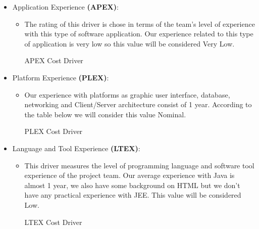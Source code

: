 \begin{itemize}
	\item Application Experience \textbf{(APEX)}: 
	\begin{itemize}
	\item[] The rating of this driver is chose in terms of the team's level of experience with this type of software application. Our experience related to this type of application is very low so this value will be considered \textsf{Very Low}.
	\begin{costdriverstable}{APEX Cost Driver}
		\hline
	\end{costdriverstable}
	\end{itemize}
\end{itemize}

\begin{itemize}
	\item Platform Experience \textbf{(PLEX)}: 
	\begin{itemize}
	\item[] Our experience with platforms as graphic user interface, database, networking and Client/Server architecture consist of 1 year. According to the table below we will consider this value \textsf{Nominal}.
	\begin{costdriverstable}{PLEX Cost Driver}
		\hline
	\end{costdriverstable}
	\end{itemize}
\end{itemize}

\begin{itemize}
	\item Language and Tool Experience \textbf{(LTEX)}: 
	\begin{itemize}
	\item[] This driver measures the level of programming language and software tool experience of the project team. Our average experience with Java is almost 1 year, we also have some background on HTML but we don't have any practical experience with JEE. This value will be considered \textsf{Low}.
	\begin{costdriverstable}{LTEX Cost Driver}
		\hline
	\end{costdriverstable}
	\end{itemize}
\end{itemize}

